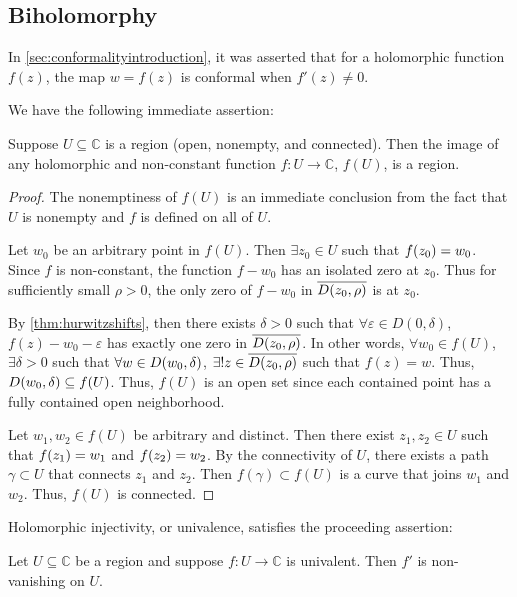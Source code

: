 \subsection{Biholomorphy}
In \cref{sec:conformalityintroduction}, it was asserted that for a holomorphic function \(f(z)\), the map \(w=f(z)\) is conformal when \(f'(z)\neq 0\).

We have the following immediate assertion:
\begin{theorem}\label{thm:openmapping}
    Suppose \(U\subseteq\mathbb{C}\) is a region (open, nonempty, and connected). Then the image of any holomorphic and non-constant function \(f:U\to\mathbb{C}\), \(f(U)\), is a region.
\end{theorem}
\begin{proof}
    The nonemptiness of \(f(U)\) is an immediate conclusion from the fact that \(U\) is nonempty and \(f\) is defined on all of \(U\).

    Let \(w_0\) be an arbitrary point in \(f(U)\). Then \(\exists z_0\in U\) such that \(f\qty(z_0)=w_0\). Since \(f\) is non-constant, the function \(f-w_0\) has an isolated zero at \(z_0\). Thus for sufficiently small \(\rho>0\), the only zero of \(f-w_0\) in \(\overline{D\qty(z_0,\rho)}\) is at \(z_0\).

    By \cref{thm:hurwitzshifts}, then there exists \(\delta>0\) such that \(\forall\varepsilon\in D(0,\delta)\), \(f(z)-w_0-\varepsilon\) has exactly one zero in \(\overline{D\qty(z_0,\rho)}\). In other words, \(\forall w_0\in f(U)\), \(\exists\delta>0\) such that \(\forall w\in D\qty(w_0,\delta)\), \(\exists! z\in\overline{D\qty(z_0,\rho)}\) such that \(f(z)=w\). Thus, \(D\qty(w_0,\delta)\subseteq f(U)\). Thus, \(f(U)\) is an open set since each contained point has a fully contained open neighborhood.

    Let \(w_1,w_2\in f(U)\) be arbitrary and distinct. Then there exist \(z_1, z_2\in U\) such that \(f\qty(z_1)=w_1\) and \(f\qty(z_2)=w_2\). By the connectivity of \(U\), there exists a path \(\gamma\subset U\) that connects \(z_1\) and \(z_2\). Then \(f(\gamma)\subset f(U)\) is a curve that joins \(w_1\) and \(w_2\). Thus, \(f(U)\) is connected. %
\end{proof}
Holomorphic injectivity, or univalence, satisfies the proceeding assertion:
\begin{lemma}\label{lem:univalentnonvanishingderivative}
    Let \(U\subseteq\mathbb{C}\) be a region and suppose \(f:U\to\mathbb{C}\) is univalent. Then \(f'\) is non-vanishing on \(U\).
\end{lemma}

